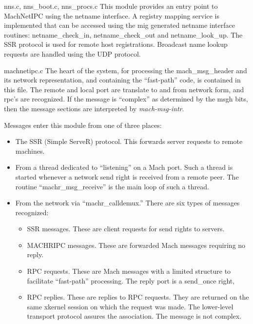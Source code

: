 \begin{description}

\item {nns.c, nns_boot.c, nns_procs.c}
This module provides an entry point to MachNetIPC using the netname 
interface. A registry mapping service is implemented that can be 
accessed using the mig generated netname interface routines: 
netname_check_in, netname_check_out and netname_look_up.
The SSR protocol is used for remote host registrations. Broadcast name
lookup requests are handled using the UDP protocol.

\item {machnetipc.c}
The heart of the system, for processing the mach\_msg\_header and its
network representation, and containing the ``fast-path'' code, is
contained in this file.  The remote and local port are translate to
and from network form, and rpc's are recognized.  If the message is
``complex'' as determined by the msgh bits, then the message sections
are interpreted by {\em mach-msg-intr}.

Messages enter this module from one of three places:
\begin{itemize}
\item The SSR (Simple ServeR) protocol.	 This forwards server requests
to remote machines.

\item From a thread dedicated to ``listening'' on a Mach port.  Such a
thread is started whenever a network send right is received from a
remote peer.  The routine ``machr\_msg\_receive'' is the main loop of such
a thread.

\item From the network via ``machr\_calldemux.''  There are six types
of messages recognized:

\begin{itemize}
\item SSR messages.  These are client requests for send rights to servers.

\item MACHRIPC messages.  These are forwarded Mach messages requiring no
reply.

\item RPC requests.  These are Mach messages with a limited structure to
facilitate ``fast-path'' processing.  The reply port is a send\_once right,

\item RPC replies.  These are replies to RPC requests.  They are returned
on the same xkernel session on which the request was made.  The lower-level
transport protocol assures the association.  The message is not complex.


\end{itemize}
\end{itemize}
\end{description}
